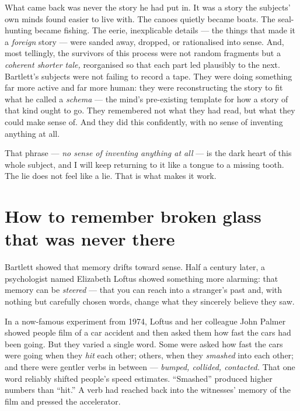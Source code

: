 What came back was never the story he had put in. It was a story the subjects' own minds found easier to live with. The canoes quietly became boats. The seal-hunting became fishing. The eerie, inexplicable details — the things that made it a \emph{foreign} story — were sanded away, dropped, or rationalised into sense. And, most tellingly, the survivors of this process were not random fragments but a \emph{coherent shorter tale,} reorganised so that each part led plausibly to the next. Bartlett's subjects were not failing to record a tape. They were doing something far more active and far more human: they were reconstructing the story to fit what he called a \emph{schema} — the mind's pre-existing template for how a story of that kind ought to go. They remembered not what they had read, but what they could make sense of. And they did this confidently, with no sense of inventing anything at all.

That phrase — \emph{no sense of inventing anything at all} — is the dark heart of this whole subject, and I will keep returning to it like a tongue to a missing tooth. The lie does not feel like a lie. That is what makes it work.

\section*{How to remember broken glass that was never there}

Bartlett showed that memory drifts toward sense. Half a century later, a psychologist named Elizabeth Loftus showed something more alarming: that memory can be \emph{steered} — that you can reach into a stranger's past and, with nothing but carefully chosen words, change what they sincerely believe they saw.

In a now-famous experiment from 1974, Loftus and her colleague John Palmer showed people film of a car accident and then asked them how fast the cars had been going. But they varied a single word. Some were asked how fast the cars were going when they \emph{hit} each other; others, when they \emph{smashed} into each other; and there were gentler verbs in between — \emph{bumped, collided, contacted.} That one word reliably shifted people's speed estimates. ``Smashed'' produced higher numbers than ``hit.'' A verb had reached back into the witnesses' memory of the film and pressed the accelerator.

